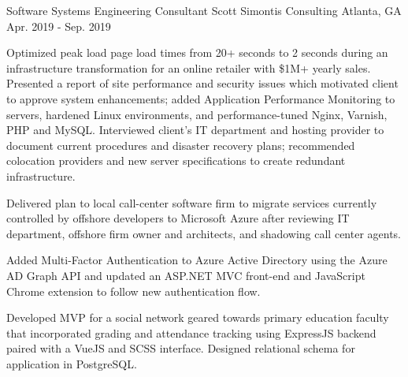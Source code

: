 \begin{cventries}
  \cventry
    {Software Systems Engineering Consultant} %
    {Scott Simontis Consulting} %
    {Atlanta, GA} %
    {Apr. 2019 - Sep. 2019} %
    {
      \begin{cvitems} %
        \item {Optimized peak load page load times from 20+ seconds to 2 seconds during an infrastructure transformation for an online retailer with \$1M+ yearly sales. Presented a report of site performance and security issues which motivated client to approve system enhancements; added Application Performance Monitoring to servers, hardened Linux environments, and performance-tuned Nginx, Varnish, PHP and MySQL. Interviewed client's IT department and hosting provider to document current procedures and disaster recovery plans; recommended colocation providers and new server specifications to create redundant infrastructure.}
        \item {Delivered plan to local call-center software firm to migrate services currently controlled by offshore developers to Microsoft Azure after reviewing IT department, offshore firm owner and architects, and shadowing call center agents.}
        \item {Added Multi-Factor Authentication to Azure Active Directory using the Azure AD Graph API and updated an ASP.NET MVC front-end and JavaScript Chrome extension to follow new authentication flow.}
        \item {Developed MVP for a social network geared towards primary education faculty that incorporated grading and attendance tracking using ExpressJS backend paired with a VueJS and SCSS interface. Designed relational schema for application in PostgreSQL.}
      \end{cvitems}
    }


\end{cventries}

